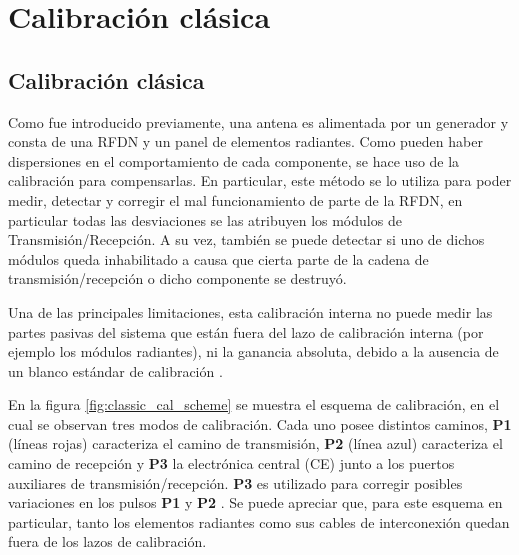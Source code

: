 
\chapter{Calibración clásica}
\label{ch:classicalCalibration}

\section{Calibración clásica}

Como fue introducido previamente, una antena es alimentada por un generador y consta de una RFDN y un panel de elementos 
radiantes. Como pueden haber dispersiones en el comportamiento de cada componente, se hace uso de la calibración para 
compensarlas. En particular, este método se lo utiliza para poder medir, detectar y corregir el mal funcionamiento de parte de 
la RFDN, en particular todas las desviaciones se las atribuyen los módulos de Transmisión/Recepción. A su vez, también se 
puede detectar si uno de dichos módulos queda inhabilitado a causa que cierta parte de la cadena de transmisión/recepción 
o dicho componente se destruyó.

Una de las principales limitaciones, esta calibración interna no puede medir las partes pasivas del sistema que están fuera del
lazo de calibración interna (por ejemplo los módulos radiantes), ni la ganancia absoluta, debido a la ausencia de un blanco 
estándar de calibración \cite{Wang2010}.

En la figura \ref{fig:classic_cal_scheme} se muestra el esquema de calibración, en el cual se observan tres modos de
calibración. Cada uno posee distintos caminos, \textbf{P1} (líneas rojas) caracteriza el camino de transmisión, \textbf{P2}
(línea azul) caracteriza el camino de recepción y \textbf{P3} la electrónica central (CE) junto a los puertos auxiliares de
transmisión/recepción. \textbf{P3} es utilizado para corregir posibles variaciones en los pulsos \textbf{P1} y \textbf{P2}
\cite{Makhoul2012}. Se puede apreciar que, para este esquema en particular, tanto los elementos radiantes como sus cables de 
interconexión quedan fuera de los lazos de calibración.

